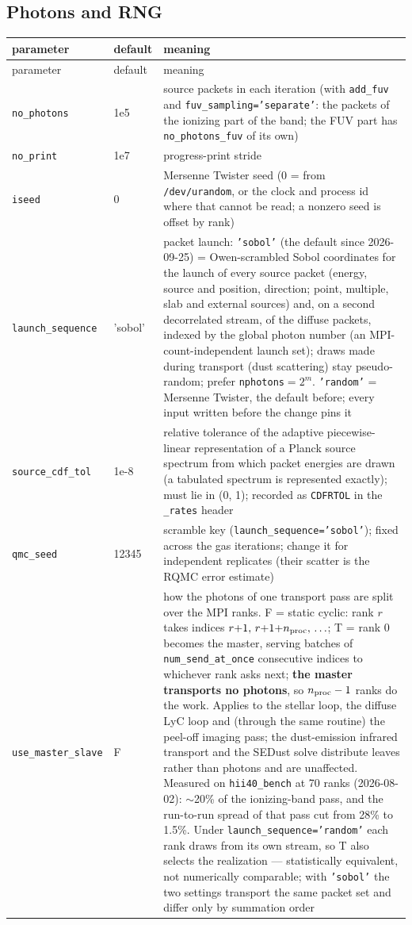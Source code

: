 \documentclass[english,a4paper]{my_memo}
\newcommand{\code}[1]{\texttt{#1}}
\begin{document}
\subsection{Photons and RNG}
{\small
\begin{longtable}{llp{7.6cm}}
\toprule
parameter & default & meaning \\
\midrule
\endfirsthead
\toprule
parameter & default & meaning \\
\midrule
\endhead
\bottomrule
\endlastfoot
\code{no\_photons} & 1e5 & source packets in each iteration (with \code{add\_fuv} and \code{fuv\_sampling='separate'}: the packets of the ionizing part of the band; the FUV part has \code{no\_photons\_fuv} of its own) \\
\code{no\_print}   & 1e7 & progress-print stride \\
\code{iseed}       & 0   & Mersenne Twister seed (0 = from \code{/dev/urandom}, or the clock and process id where that cannot be read; a nonzero seed is offset by rank) \\
\code{launch\_sequence} & 'sobol' & packet launch: \code{'sobol'} (the default since 2026-09-25) = Owen-scrambled Sobol coordinates for the launch of every source packet (energy, source and position, direction; point, multiple, slab and external sources) and, on a second decorrelated stream, of the diffuse packets, indexed by the global photon number (an MPI-count-independent launch set); draws made during transport (dust scattering) stay pseudo-random; prefer \code{nphotons}${}=2^m$.  \code{'random'} = Mersenne Twister, the default before; every input written before the change pins it \\
\code{source\_cdf\_tol} & 1e-8 & relative tolerance of the adaptive piecewise-linear representation of a Planck source spectrum from which packet energies are drawn (a tabulated spectrum is represented exactly); must lie in (0, 1); recorded as \code{CDFRTOL} in the \code{\_rates} header \\
\code{qmc\_seed}   & 12345 & scramble key (\code{launch\_sequence='sobol'}); fixed across the gas iterations; change it for independent replicates (their scatter is the RQMC error estimate) \\
\code{use\_master\_slave} & F & how the photons of one transport pass are split over the MPI ranks.  F = static cyclic: rank $r$ takes indices $r{+}1,\,r{+}1{+}n_{\rm proc},\,\ldots$; T = rank 0 becomes the master, serving batches of \code{num\_send\_at\_once} consecutive indices to whichever rank asks next; \textbf{the master transports no photons}, so $n_{\rm proc}-1$ ranks do the work.  Applies to the stellar loop, the diffuse LyC loop and (through the same routine) the peel-off imaging pass; the dust-emission infrared transport and the SEDust solve distribute leaves rather than photons and are unaffected.  Measured on \code{hii40\_bench} at 70 ranks (2026-08-02): $\sim$20\% of the ionizing-band pass, and the run-to-run spread of that pass cut from 28\% to 1.5\%.  Under \code{launch\_sequence='random'} each rank draws from its own stream, so T also selects the realization --- statistically equivalent, not numerically comparable; with \code{'sobol'} the two settings transport the same packet set and differ only by summation order \\

\end{longtable}}
\end{document}
